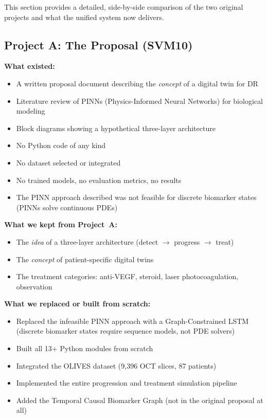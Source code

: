 \documentclass[12pt,a4paper]{article}
\begin{document}
This section provides a detailed, side-by-side comparison of the two original projects and what the unified system now delivers.

\subsection{Project A: The Proposal (SVM10)}

\textbf{What existed:}
\begin{itemize}[nosep]
  \item A written proposal document describing the \emph{concept} of a digital twin for DR
  \item Literature review of PINNs (Physics-Informed Neural Networks) for biological modeling
  \item Block diagrams showing a hypothetical three-layer architecture
  \item No Python code of any kind
  \item No dataset selected or integrated
  \item No trained models, no evaluation metrics, no results
  \item The PINN approach described was not feasible for discrete biomarker states (PINNs solve continuous PDEs)
\end{itemize}

\textbf{What we kept from Project~A:}
\begin{itemize}[nosep]
  \item The \emph{idea} of a three-layer architecture (detect $\to$ progress $\to$ treat)
  \item The \emph{concept} of patient-specific digital twins
  \item The treatment categories: anti-VEGF, steroid, laser photocoagulation, observation
\end{itemize}

\textbf{What we replaced or built from scratch:}
\begin{itemize}[nosep]
  \item Replaced the infeasible PINN approach with a Graph-Constrained LSTM (discrete biomarker states require sequence models, not PDE solvers)
  \item Built all 13+ Python modules from scratch
  \item Integrated the OLIVES dataset (9,396 OCT slices, 87 patients)
  \item Implemented the entire progression and treatment simulation pipeline
  \item Added the Temporal Causal Biomarker Graph (not in the original proposal at all)
\end{itemize}
\end{document}

